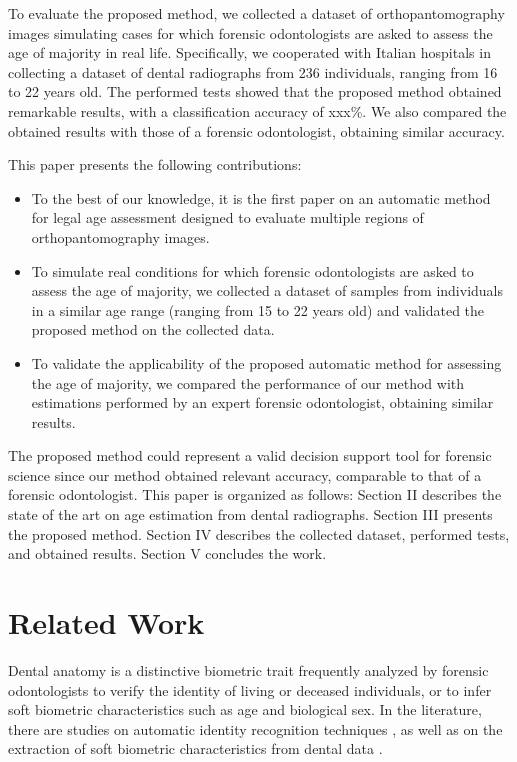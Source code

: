 \documentclass[conference]{IEEEtran}
\begin{document}
To evaluate the proposed method, we collected a dataset of orthopantomography images simulating cases for which forensic odontologists are asked to assess the age of majority in real life. Specifically, we cooperated with Italian hospitals in collecting a dataset of dental radiographs from 236 individuals, ranging from 16 to 22 years old. The performed tests showed that the proposed method obtained remarkable results, with a classification accuracy of xxx\%. We also compared the obtained results with those of a forensic odontologist, obtaining similar accuracy.


This paper presents the following contributions:
\begin{itemize}
\item To the best of our knowledge, it is the first paper on an automatic method for legal age assessment designed to evaluate multiple regions of orthopantomography images.
\item To simulate real conditions for which forensic odontologists are asked to assess the age of majority, we collected a dataset of samples from individuals in a similar age range (ranging from 15 to 22 years old) and validated the proposed method on the collected data.
\item To validate the applicability of the proposed automatic method for assessing the age of majority, we compared the performance of our method with estimations performed by an expert forensic odontologist, obtaining similar results.
\end{itemize}

The proposed method could represent a valid decision support tool for forensic science since our method obtained relevant accuracy, comparable to that of a forensic odontologist.
This paper is organized as follows: Section II describes the state of the art on age estimation from dental radiographs. Section III presents the proposed method. Section IV describes the collected dataset, performed tests, and obtained results. Section V concludes the work.



\section{Related Work}


Dental anatomy is a distinctive biometric trait frequently analyzed by forensic odontologists to verify the identity of living or deceased individuals, or to infer soft biometric characteristics \cite{DonidaLabati2019} such as age and biological sex.
In the literature, there are studies on automatic identity recognition techniques \cite{jainDenti}, as well as on the extraction of soft biometric characteristics from dental data \cite{survey}.
\end{document}
